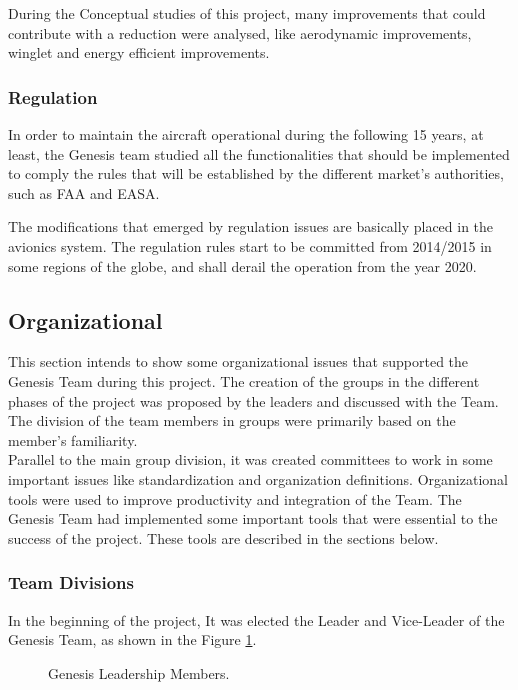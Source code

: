 During the Conceptual studies of this project, many improvements that could contribute with a reduction were analysed, like aerodynamic improvements, winglet and energy efficient improvements.

\subsubsection{Regulation}
\label{sec:RegulationFrontOverview}
In order to maintain the aircraft operational during the following 15 years, at least, the Genesis team studied all the functionalities that should be implemented to comply the rules that will be established by the different market's authorities, such as FAA and EASA.

The modifications that emerged by regulation issues are basically placed in the avionics system. The regulation rules start to be committed from 2014/2015 in some regions of the globe, and shall derail the operation from the year 2020.

\subsection{Organizational}

This section intends to show some organizational issues that supported the Genesis Team during this project.
The creation of the groups in the different phases of the project was proposed by the leaders and discussed with the Team. The division of the team members in groups were primarily based on the member's familiarity.
\\Parallel to the main group division, it was created committees to work in some important issues like standardization and organization definitions.
Organizational tools were used to improve productivity and integration of the
Team. The Genesis Team had implemented some important tools that were essential to
the success of the project. These tools are described in the sections below.

\subsubsection{Team Divisions}
In the beginning of the project, It was elected the Leader and Vice-Leader of the Genesis Team, as shown in the Figure \ref{fig:GenesisLeadershipMembers}.

\begin{figure}[H] %
\caption{Genesis Leadership Members.}
\label{fig:GenesisLeadershipMembers}
\end{figure}


